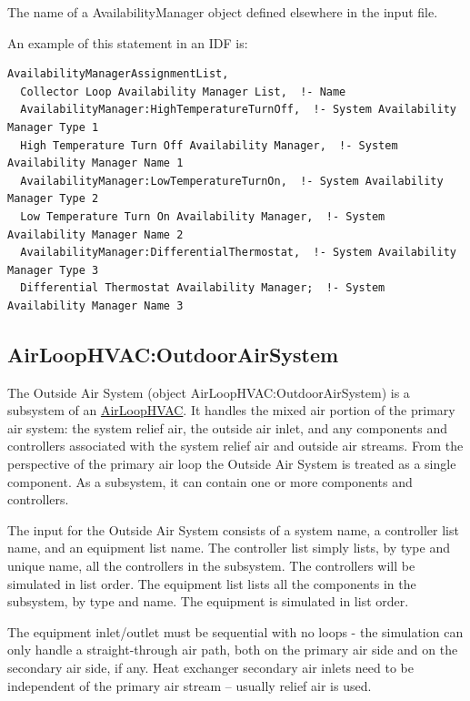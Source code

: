 The name of a AvailabilityManager object defined elsewhere in the input file.

An example of this statement in an IDF is:

\begin{lstlisting}
AvailabilityManagerAssignmentList,
  Collector Loop Availability Manager List,  !- Name
  AvailabilityManager:HighTemperatureTurnOff,  !- System Availability Manager Type 1
  High Temperature Turn Off Availability Manager,  !- System Availability Manager Name 1
  AvailabilityManager:LowTemperatureTurnOn,  !- System Availability Manager Type 2
  Low Temperature Turn On Availability Manager,  !- System Availability Manager Name 2
  AvailabilityManager:DifferentialThermostat,  !- System Availability Manager Type 3
  Differential Thermostat Availability Manager;  !- System Availability Manager Name 3
\end{lstlisting}

\subsection{AirLoopHVAC:OutdoorAirSystem}\label{airloophvacoutdoorairsystem}

The Outside Air System (object AirLoopHVAC:OutdoorAirSystem) is a subsystem of an \hyperref[airloophvac]{AirLoopHVAC}. It handles the mixed air portion of the primary air system: the system relief air, the outside air inlet, and any components and controllers associated with the system relief air and outside air streams. From the perspective of the primary air loop the Outside Air System is treated as a single component. As a subsystem, it can contain one or more components and controllers.

The input for the Outside Air System consists of a system name, a controller list name, and an equipment list name. The controller list simply lists, by type and unique name, all the controllers in the subsystem. The controllers will be simulated in list order. The equipment list lists all the components in the subsystem, by type and name. The equipment is simulated in list order.

The equipment inlet/outlet must be sequential with no loops - the simulation can only handle a straight-through air path, both on the primary air side and on the secondary air side, if any. Heat exchanger secondary air inlets need to be independent of the primary air stream -- usually relief air is used.

